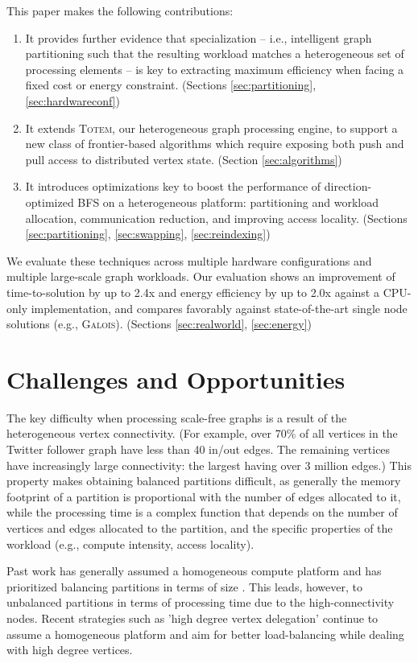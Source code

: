 \documentclass{llncs}
\begin{document}
This paper makes the following contributions:\begin{enumerate}\setlength{\itemsep}{0pt}\setlength{\parskip}{0pt}\item It provides further evidence that specialization -- i.e., intelligent graph partitioning such that the resulting workload matches a heterogeneous set of processing elements -- is key to extracting maximum efficiency when facing a fixed cost or energy constraint. (Sections \ref{sec:partitioning}, \ref{sec:hardwareconf})\item It extends \textsc{Totem}, our heterogeneous graph processing engine, to support a new class of frontier-based algorithms which require exposing both push and pull access to distributed vertex state. (Section \ref{sec:algorithms})
\item It introduces optimizations key to boost the performance of direction-optimized BFS on a heterogeneous platform: partitioning and workload allocation, communication reduction, and improving access locality. (Sections \ref{sec:partitioning}, \ref{sec:swapping}, \ref{sec:reindexing})
\end{enumerate}We evaluate these techniques across multiple hardware configurations and multiple large-scale graph workloads. Our evaluation shows an improvement of time-to-solution by up to 2.4x and energy efficiency by up to 2.0x against a CPU-only implementation, and compares favorably against state-of-the-art single node solutions (e.g., \textsc{Galois}). (Sections \ref{sec:realworld}, \ref{sec:energy})\section{Challenges and Opportunities}\label{sec:opportunities}The key difficulty when processing scale-free graphs is a result of the heterogeneous vertex connectivity. (For example, over 70\% of all vertices in the Twitter follower graph \cite{cha2010measuring} have less than 40 in/out edges. The remaining vertices have increasingly large connectivity: the largest having over 3 million edges.) This property makes obtaining balanced partitions difficult, as generally the memory footprint of a partition is proportional with the number of edges allocated to it, while the processing time is a complex function that depends on the number of vertices and edges allocated to the partition, and the specific properties of the workload (e.g., compute intensity, access locality).

Past work has generally assumed a homogeneous compute platform and has prioritized balancing partitions in terms of size \cite{pearce2013scaling}. This leads, however, to unbalanced partitions in terms of processing time due to the high-connectivity nodes. Recent strategies such as 'high degree vertex delegation' \cite{pearce2014faster} continue to assume a homogeneous platform and aim for better load-balancing while dealing with high degree vertices.
\end{document}

